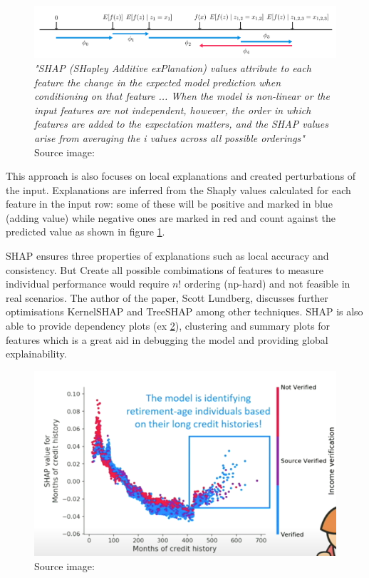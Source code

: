\documentclass[proposal]{softeng}
\begin{document}
\begin{figure}[h!]
\centering
  \includegraphics[width=1.0\textwidth]{images/shap_feature_ordering.png}
  \caption{\textit{"SHAP (SHapley Additive exPlanation) values attribute to each feature the change in the expected model prediction when conditioning on that feature ... When the model is non-linear or the input features are not independent, however, the order in which features are added to the expectation matters, and the SHAP values arise from averaging the i values across all possible orderings"} Source image: \cite{LundbergScott2017AUAt}}
  \label{fig:shap_feature_ordering}
\end{figure}

This approach is also focuses  on local explanations and created perturbations of the input. Explanations are inferred from the Shaply values calculated for each feature in the input row: some of these will be positive and marked in blue (adding value) while negative ones are marked in red and count against the predicted value as shown in figure \ref{fig:shap_feature_ordering}.

SHAP ensures three properties of explanations such as local accuracy and consistency. But Create all possible combimations of features to measure individual performance would require  $ n! $ ordering (np-hard) and not feasible in real scenarios. The author of the paper, Scott Lundberg, discusses further optimisations \cite{Lundberg}
KernelSHAP and TreeSHAP among other techniques. SHAP is also able to provide dependency plots (ex \ref{fig:shap_dp}), clustering and summary plots for features which is a great aid in debugging the model and providing global explainability.

\begin{figure}[h!]
\centering
  \includegraphics[width=.6\textwidth]{images/shap_dp.png}
  \caption{Source image: \cite{Lundberg}}
  \label{fig:shap_dp}
\end{figure}
\end{document}
